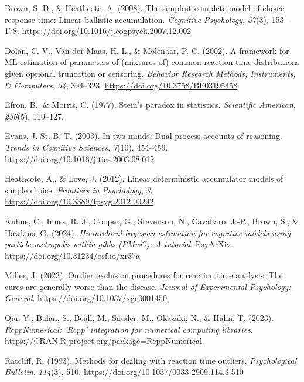 \documentclass[
  stu,
  floatsintext,
  longtable,
  nolmodern,
  notxfonts,
  notimes,
  draftfirst,
  colorlinks=true,linkcolor=blue,citecolor=blue,urlcolor=blue]{apa7}
\newlength{\cslhangindent}
\newenvironment{CSLReferences}[2] %
 {\begin{list}{}{%
  \setlength{\itemindent}{0pt}
  \setlength{\leftmargin}{0pt}
  \setlength{\parsep}{0pt}
  \ifodd #1
   \setlength{\leftmargin}{\cslhangindent}
   \setlength{\itemindent}{-1\cslhangindent}
  \fi
  \setlength{\itemsep}{#2\baselineskip}}}
 {\end{list}}
\begin{document}
\label{refs}
\begin{CSLReferences}{1}{0}
Brown, S. D., \& Heathcote, A. (2008). The simplest complete model of
choice response time: Linear ballistic accumulation. \emph{Cognitive
Psychology}, \emph{57}(3), 153--178.
\url{https://doi.org/10.1016/j.cogpsych.2007.12.002}

Dolan, C. V., Van der Maas, H. L., \& Molenaar, P. C. (2002). A
framework for ML estimation of parameters of (mixtures of) common
reaction time distributions given optional truncation or censoring.
\emph{Behavior Research Methods, Instruments, \& Computers}, \emph{34},
304--323. \url{https://doi.org/10.3758/BF03195458}

Efron, B., \& Morris, C. (1977). Stein's paradox in statistics.
\emph{Scientific American}, \emph{236}(5), 119--127.

Evans, J. St. B. T. (2003). In two minds: Dual-process accounts of
reasoning. \emph{Trends in Cognitive Sciences}, \emph{7}(10), 454--459.
\url{https://doi.org/10.1016/j.tics.2003.08.012}

Heathcote, A., \& Love, J. (2012). Linear deterministic accumulator
models of simple choice. \emph{Frontiers in Psychology}, \emph{3}.
\url{https://doi.org/10.3389/fpsyg.2012.00292}

Kuhne, C., Innes, R. J., Cooper, G., Stevenson, N., Cavallaro, J.-P.,
Brown, S., \& Hawkins, G. (2024). \emph{Hierarchical bayesian estimation
for cognitive models using particle metropolis within gibbs (PMwG): A
tutorial}. PsyArXiv. \url{https://doi.org/10.31234/osf.io/xr37a}

Miller, J. (2023). Outlier exclusion procedures for reaction time
analysis: The cures are generally worse than the disease. \emph{Journal
of Experimental Psychology: General}.
\url{https://doi.org/10.1037/xge0001450}

Qiu, Y., Balan, S., Beall, M., Sauder, M., Okazaki, N., \& Hahn, T.
(2023). \emph{RcppNumerical: 'Rcpp' integration for numerical computing
libraries}. \url{https://CRAN.R-project.org/package=RcppNumerical}

Ratcliff, R. (1993). Methods for dealing with reaction time outliers.
\emph{Psychological Bulletin}, \emph{114}(3), 510.
\url{https://doi.org/10.1037/0033-2909.114.3.510}


\end{CSLReferences}
\end{document}

